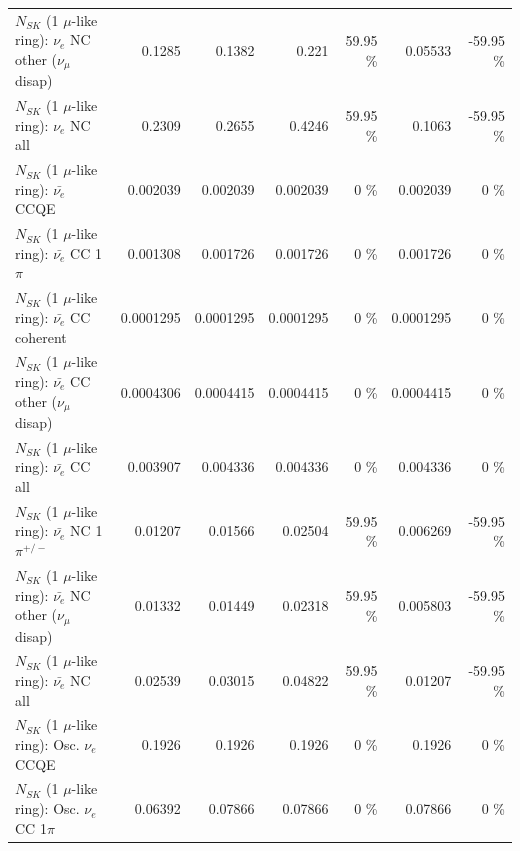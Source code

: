 \begin{table}
\begin{tabular}{| l | r | r | r  r | r  r |}
                $N_{SK}$ (1 $\mu$-like ring): $\nu_e$ NC other ($\nu_\mu$ disap) &          0.1285 &          0.1382 &           0.221 &    59.95 \%  &         0.05533 &   -59.95 \%  \\ 
                                  $N_{SK}$ (1 $\mu$-like ring): $\nu_{e}$ NC all &          0.2309 &          0.2655 &          0.4246 &    59.95 \%  &          0.1063 &   -59.95 \%  \\ 
\hline
\hline
\hline
                                $N_{SK}$ (1 $\mu$-like ring): $\bar{\nu_e}$ CCQE &        0.002039 &        0.002039 &        0.002039 &        0 \%  &        0.002039 &        0 \%  \\ 
                           $N_{SK}$ (1 $\mu$-like ring): $\bar{\nu_e}$ CC 1$\pi$ &        0.001308 &        0.001726 &        0.001726 &        0 \%  &        0.001726 &        0 \%  \\ 
                         $N_{SK}$ (1 $\mu$-like ring): $\bar{\nu_e}$ CC coherent &       0.0001295 &       0.0001295 &       0.0001295 &        0 \%  &       0.0001295 &        0 \%  \\ 
          $N_{SK}$ (1 $\mu$-like ring): $\bar{\nu_e}$ CC other ($\nu_\mu$ disap) &       0.0004306 &       0.0004415 &       0.0004415 &        0 \%  &       0.0004415 &        0 \%  \\ 
                            $N_{SK}$ (1 $\mu$-like ring): $\bar{\nu_{e}}$ CC all &        0.003907 &        0.004336 &        0.004336 &        0 \%  &        0.004336 &        0 \%  \\ 
\hline
                     $N_{SK}$ (1 $\mu$-like ring): $\bar{\nu_e}$ NC 1$\pi^{+/-}$ &         0.01207 &         0.01566 &         0.02504 &    59.95 \%  &        0.006269 &   -59.95 \%  \\ 
          $N_{SK}$ (1 $\mu$-like ring): $\bar{\nu_e}$ NC other ($\nu_\mu$ disap) &         0.01332 &         0.01449 &         0.02318 &    59.95 \%  &        0.005803 &   -59.95 \%  \\ 
                            $N_{SK}$ (1 $\mu$-like ring): $\bar{\nu_{e}}$ NC all &         0.02539 &         0.03015 &         0.04822 &    59.95 \%  &         0.01207 &   -59.95 \%  \\ 
\hline
\hline
\hline
                                 $N_{SK}$ (1 $\mu$-like ring): Osc. $\nu_e$ CCQE &          0.1926 &          0.1926 &          0.1926 &        0 \%  &          0.1926 &        0 \%  \\ 
                            $N_{SK}$ (1 $\mu$-like ring): Osc. $\nu_e$ CC 1$\pi$ &         0.06392 &         0.07866 &         0.07866 &        0 \%  &         0.07866 &        0 \%  \\ 

\end{tabular}
\end{table}

